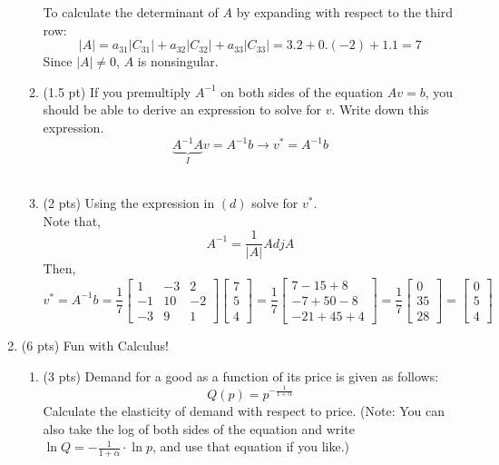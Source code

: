 \documentclass{./../../../Latex/tests}
\begin{document}
\begin{enumerate}
\begin{enumerate}
To calculate the determinant of $A$ by expanding with respect to the third row:
$$ |A| = a_{31}|C_{31}| + a_{32}|C_{32}| + a_{33}|C_{33}| = 3.2+0.(-2)+1.1 = 7 $$
Since $|A| \neq 0$, $A$ is nonsingular. \\
  \item (1.5 pt) If you premultiply $A^{-1}$ on both sides of the equation $ Av=b $, you should be able to derive an expression to solve for $v$. Write down this expression. 
  $$ \underbrace{A^{-1}A}_{I}v=A^{-1}b \rightarrow v^* =A^{-1}b  $$\\
  
  \item (2 pts) Using the expression in $(d)$ solve for $v^*$. \\
  
  Note that, $$ A^{-1} = \frac{1}{|A|} Adj A$$
  Then, 
  $$ v^* =A^{-1}b = \frac{1}{7}\begin{bmatrix}
	1 & -3 & 2 \\
	-1 & 10 & -2 \\
	-3 & 9 & 1 
\end{bmatrix} \begin{bmatrix}
	7 \\ 5 \\ 4
\end{bmatrix} = \frac{1}{7} \begin{bmatrix}
	7-15+8 \\ -7+50-8 \\ -21+45+4
\end{bmatrix}  =\frac{1}{7} \begin{bmatrix}
	0 \\ 35 \\ 28
\end{bmatrix} = \begin{bmatrix}
	0 \\ 5 \\ 4
\end{bmatrix}$$
\end{enumerate}


\newpage
\item (6 pts) Fun with Calculus!
\begin{enumerate}
\item (3 pts) Demand for a good as a function of its price is given as follows:
$$ Q(p) = p^{-\frac{1}{1+\alpha}}  $$
Calculate the elasticity of demand with respect to price. (Note: You can also take the log of both sides of the equation and write $\ln Q = -\frac{1}{1+\alpha} \cdot \ln p$, and use that equation if you like.) \\~\\


\end{enumerate}
\end{enumerate}
\end{document}
